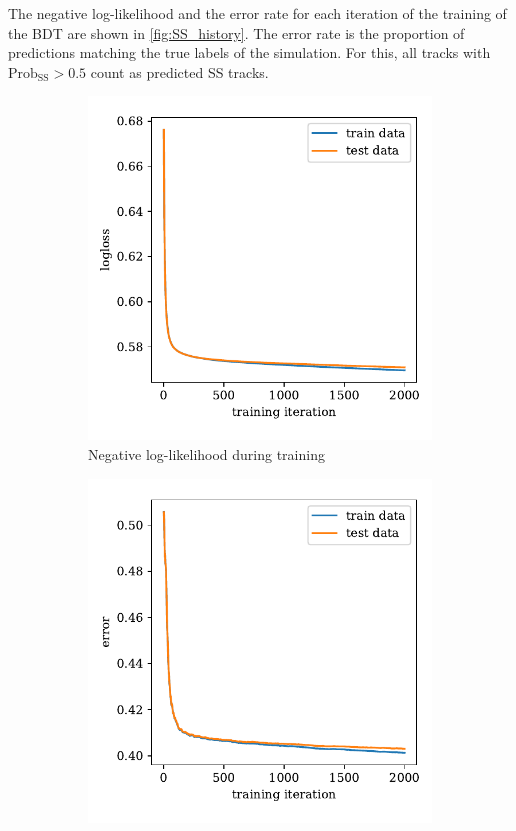 The negative log-likelihood and the error rate for each iteration of the training of the BDT are shown in \cref{fig:SS_history}.
The error rate is the proportion of predictions matching the true labels of the simulation.
For this, all tracks with $\text{Prob}_\text{SS}>0.5$ count as predicted SS tracks. 

\begin{figure}
    \centering
    \begin{subfigure}{0.5\textwidth}
        \centering
        \includegraphics[width=\textwidth]{images/SS_history_logloss.pdf}
        \caption{Negative log-likelihood during training}
    \end{subfigure}%
    \begin{subfigure}{0.5\textwidth}
        \centering
        \includegraphics[width=\textwidth]{images/SS_history_error.pdf}

\end{subfigure}
\end{figure}
